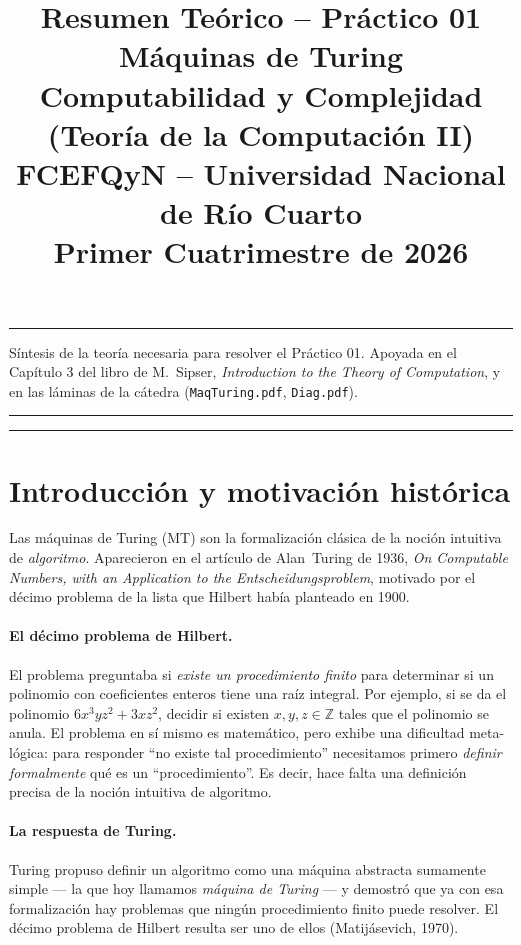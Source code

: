 \documentclass[11pt,a4paper]{article}
\title{\textbf{Resumen Te\'orico -- Pr\'actico 01}\\[0.3em]
       \large M\'aquinas de Turing\\[0.4em]
       \normalsize Computabilidad y Complejidad (Teor\'ia de la Computaci\'on II)\\
       \normalsize FCEFQyN -- Universidad Nacional de R\'io Cuarto\\
       \normalsize Primer Cuatrimestre de 2026}
\author{}
\date{}
\theoremstyle{plain}
\theoremstyle{definition}
\theoremstyle{remark}
\begin{document}
\maketitle
\thispagestyle{empty}

\hrule
\vspace{0.4em}
\begin{center}
\small
S\'intesis de la teor\'ia necesaria para resolver el Pr\'actico 01.
Apoyada en el Cap\'itulo 3 del libro de M.~Sipser,
\emph{Introduction to the Theory of Computation}, y en las l\'aminas
de la c\'atedra (\texttt{MaqTuring.pdf}, \texttt{Diag.pdf}).
\end{center}
\vspace{0.4em}
\hrule

\tableofcontents
\bigskip
\hrule
\bigskip

\section{Introducci\'on y motivaci\'on hist\'orica}
\label{sec:intro}

Las m\'aquinas de Turing (MT) son la formalizaci\'on cl\'asica de la noci\'on
intuitiva de \emph{algoritmo}. Aparecieron en el art\'iculo de Alan~Turing
de 1936, \emph{On Computable Numbers, with an Application to the
Entscheidungsproblem}, motivado por el d\'ecimo problema de la lista que
Hilbert hab\'ia planteado en 1900.

\paragraph{El d\'ecimo problema de Hilbert.} El problema preguntaba si
\emph{existe un procedimiento finito} para determinar si un polinomio con
coeficientes enteros tiene una ra\'iz integral. Por ejemplo, si se da el
polinomio $6x^3yz^2 + 3xz^2$, decidir si existen $x,y,z\in\mathbb Z$ tales
que el polinomio se anula. El problema en s\'i mismo es matem\'atico, pero
exhibe una dificultad meta-l\'ogica: para responder ``no existe tal
procedimiento'' necesitamos primero \emph{definir formalmente} qu\'e es un
``procedimiento''. Es decir, hace falta una definici\'on precisa de la
noci\'on intuitiva de algoritmo.

\paragraph{La respuesta de Turing.} Turing propuso definir un algoritmo
como una m\'aquina abstracta sumamente simple --- la que hoy llamamos
\emph{m\'aquina de Turing} --- y demostr\'o que ya con esa formalizaci\'on
hay problemas que ning\'un procedimiento finito puede resolver. El d\'ecimo
problema de Hilbert resulta ser uno de ellos (Matij\'asevich, 1970).
\end{document}
